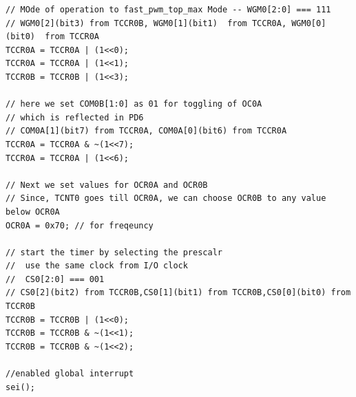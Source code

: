 \documentclass{article}
\begin{document}
\begin{verbatim}
// MOde of operation to fast_pwm_top_max Mode -- WGM0[2:0] === 111
// WGM0[2](bit3) from TCCR0B, WGM0[1](bit1)  from TCCR0A, WGM0[0](bit0)  from TCCR0A
TCCR0A = TCCR0A | (1<<0);
TCCR0A = TCCR0A | (1<<1);
TCCR0B = TCCR0B | (1<<3);	

// here we set COM0B[1:0] as 01 for toggling of OC0A
// which is reflected in PD6
// COM0A[1](bit7) from TCCR0A, COM0A[0](bit6) from TCCR0A
TCCR0A = TCCR0A & ~(1<<7);
TCCR0A = TCCR0A | (1<<6);

// Next we set values for OCR0A and OCR0B
// Since, TCNT0 goes till OCR0A, we can choose OCR0B to any value below OCR0A
OCR0A = 0x70; // for freqeuncy

// start the timer by selecting the prescalr
//  use the same clock from I/O clock
//  CS0[2:0] === 001
// CS0[2](bit2) from TCCR0B,CS0[1](bit1) from TCCR0B,CS0[0](bit0) from TCCR0B
TCCR0B = TCCR0B | (1<<0);
TCCR0B = TCCR0B & ~(1<<1);
TCCR0B = TCCR0B & ~(1<<2);

//enabled global interrupt
sei();
\end{verbatim}
\end{document}
